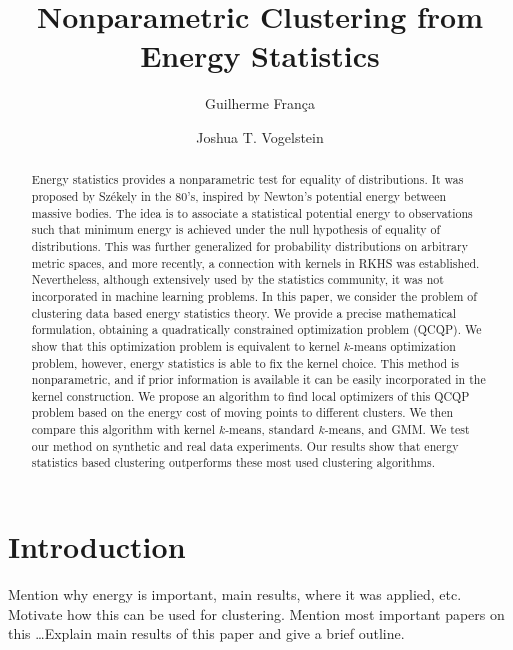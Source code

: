 \documentclass[aps,preprint,nofootinbib,floatfix]{revtex4-1}
\begin{document}
\title{Nonparametric Clustering from  Energy Statistics}

\author{Guilherme Fran\c ca}

\author{Joshua T. Vogelstein}



\begin{abstract}
Energy statistics provides a nonparametric test for equality of distributions.
It was proposed by 
Sz\' ekely in the 80's,
inspired by Newton's potential energy between massive bodies. The idea
is to associate a statistical potential energy to observations such that 
minimum energy is achieved under the null hypothesis of equality of 
distributions. This 
was further generalized for probability 
distributions on arbitrary metric spaces,
and more recently, a connection with kernels in RKHS was established.
Nevertheless, although extensively used by the statistics community, it was
not incorporated in machine learning problems.
In this paper, we consider the problem of clustering data based
energy statistics theory. 
We provide a precise mathematical formulation, obtaining
a quadratically constrained optimization problem (QCQP). We show that
this optimization problem is equivalent to kernel $k$-means
optimization problem, however,
energy statistics is able to fix the kernel choice. 
This method is nonparametric, and if prior information is available
it can be easily incorporated in the kernel construction.
We propose an algorithm
to find local optimizers of this QCQP problem based on the energy cost
of moving points to different clusters. We then compare this algorithm with
kernel $k$-means, standard $k$-means, and GMM. We test our method
on synthetic and real data experiments.
Our results show that energy statistics based clustering outperforms
these most used clustering algorithms.
\end{abstract}

\maketitle

\section{Introduction}

Mention why energy is important, main results, where it was applied, etc.
Motivate how this can be used for clustering. Mention most important
papers on this \ldots Explain main results of this paper and give a brief
outline.
\end{document}
